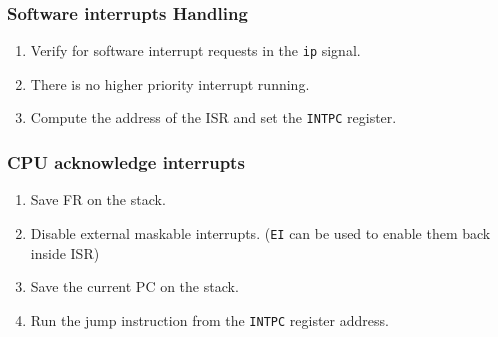 \begin{frame}
    \frametitle{Software interrupts Handling}
    \begin{enumerate}
        \item Verify for software interrupt requests in the \texttt{ip} signal.
        \item There is no higher priority interrupt running.
        \item Compute the address of the ISR and set the \texttt{INTPC} register.
    \end{enumerate}
\end{frame}

\begin{frame}
    \frametitle{CPU acknowledge interrupts}
    \begin{enumerate}
        \item Save FR on the stack.
        \item Disable external maskable interrupts. (\texttt{EI} can be used to enable them back inside ISR)
        \item Save the current PC on the stack.
        \item Run the jump instruction from the \texttt{INTPC} register address.
    \end{enumerate}
\end{frame}




